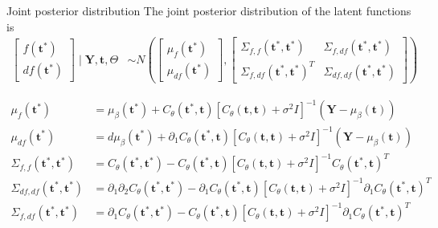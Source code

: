 \documentclass[ignorenonframetext,xcolor=pdflatex,table,dvipsnames,serif]{beamer}
\begin{document}
\begin{frame}{Joint posterior distribution}
The joint posterior distribution of the latent functions is
\begin{align*}
\begin{bmatrix}f(\mathbf{t}^\ast)\\ df(\mathbf{t}^\ast) \end{bmatrix} \mid \mathbf{Y}, \mathbf{t}, \Theta &\sim
N\left(\begin{bmatrix}\mu_f(\mathbf{t}^\ast)\\ \mu_{df}(\mathbf{t}^\ast)\end{bmatrix}, \begin{bmatrix}\Sigma_{f,f}(\mathbf{t}^\ast, \mathbf{t}^\ast) & \Sigma_{f,df}(\mathbf{t}^\ast, \mathbf{t}^\ast)\\ \Sigma_{f,df}(\mathbf{t}^\ast, \mathbf{t}^\ast)^T & \Sigma_{df,df}(\mathbf{t}^\ast, \mathbf{t}^\ast)\end{bmatrix}\right)
\end{align*}

{\footnotesize
\begin{align*}
  \mu_f(\mathbf{t}^\ast) &= \mu_{\beta}(\mathbf{t}^\ast) + C_\theta(\mathbf{t}^\ast, \mathbf{t})\left[C_\theta(\mathbf{t}, \mathbf{t}) + \sigma^2 I\right]^{-1}\left(\mathbf{Y} - \mu_\beta(\mathbf{t})\right)\nonumber\\
  \mu_{df}(\mathbf{t}^\ast) &= d\mu_{\beta}(\mathbf{t}^\ast) + \partial_1 C_\theta(\mathbf{t}^\ast, \mathbf{t})\left[C_\theta(\mathbf{t}, \mathbf{t}) + \sigma^2 I\right]^{-1}\left(\mathbf{Y} - \mu_\beta(\mathbf{t})\right)\nonumber\\
  \Sigma_{f,f}(\mathbf{t}^\ast, \mathbf{t}^\ast) &= C_\theta(\mathbf{t}^\ast, \mathbf{t}^\ast) - C_\theta(\mathbf{t}^\ast, \mathbf{t})\left[C_\theta(\mathbf{t}, \mathbf{t}) + \sigma^2 I\right]^{-1} C_\theta(\mathbf{t}^\ast, \mathbf{t})^T\nonumber\\
  \Sigma_{df,df}(\mathbf{t}^\ast, \mathbf{t}^\ast) &= \partial_1 \partial_2 C_\theta(\mathbf{t}^\ast, \mathbf{t}^\ast) - \partial_1 C_\theta(\mathbf{t}^\ast, \mathbf{t})\left[C_\theta(\mathbf{t}, \mathbf{t}) + \sigma^2 I\right]^{-1} \partial_1 C_\theta(\mathbf{t}^\ast, \mathbf{t})^T\nonumber\\
  \Sigma_{f,df}(\mathbf{t}^\ast, \mathbf{t}^\ast) &= \partial_1 C_\theta(\mathbf{t}^\ast, \mathbf{t}^\ast) - C_\theta(\mathbf{t}^\ast, \mathbf{t})\left[C_\theta(\mathbf{t}, \mathbf{t}) + \sigma^2 I\right]^{-1}\partial_1 C_\theta(\mathbf{t}^\ast, \mathbf{t})^T\nonumber
\end{align*}
}%
\end{frame}
\end{document}

